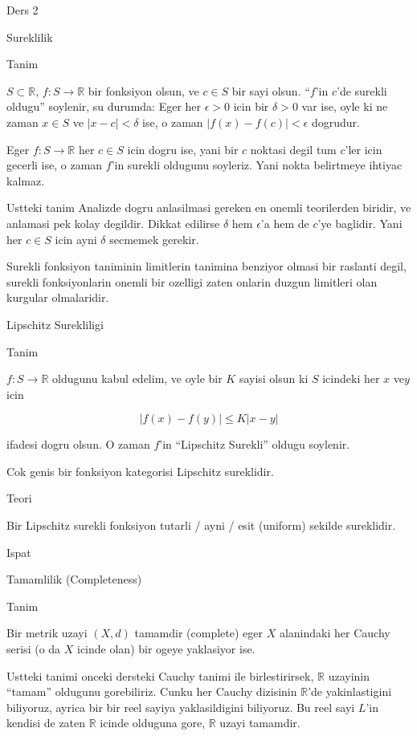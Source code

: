 \documentclass[12pt,fleqn]{article}
\begin{document}
Ders 2

Sureklilik

Tanim

$S \subset \mathbb{R}$, $f: S \to \mathbb{R}$ bir fonksiyon olsun, ve $c
\in S$ bir sayi olsun. 
``$f$'in $c$'de surekli oldugu'' soylenir, su durumda: Eger her
$\epsilon>0$ icin bir $\delta > 0$ var ise, oyle ki ne zaman $x \in S$ ve $|x-c| < \delta$
ise, o zaman $|f(x) - f(c)| < \epsilon$ dogrudur. 

Eger  $f: S \to \mathbb{R}$ her $c \in S$ icin dogru ise, yani bir $c$
noktasi degil tum $c$'ler icin gecerli ise, o zaman $f$'in surekli oldugunu
soyleriz. Yani nokta belirtmeye ihtiyac kalmaz. 

Ustteki tanim Analizde dogru anlasilmasi gereken en onemli teorilerden
biridir, ve anlamasi pek kolay degildir. Dikkat edilirse $\delta$ hem
$\epsilon$'a hem de $c$'ye baglidir. Yani her $c \in S$ icin ayni $\delta$
secmemek gerekir. 

Surekli fonksiyon taniminin limitlerin tanimina benziyor olmasi bir
raslanti degil, surekli fonksiyonlarin onemli bir ozelligi zaten onlarin
duzgun limitleri olan kurgular olmalaridir. 

Lipschitz Surekliligi 

Tanim 

$f: S \to \mathbb{R}$ oldugunu kabul edelim, ve oyle bir $K$ sayisi olsun ki $S$
icindeki her $x$ ve$y$ icin 

\[ |f(x) - f(y)| \le K|x-y| \]

ifadesi dogru olsun. O zaman $f$'in ``Lipschitz Surekli'' oldugu soylenir. 

Cok genis bir fonksiyon kategorisi Lipschitz sureklidir. 

Teori 

Bir Lipschitz surekli fonksiyon tutarli / ayni / esit (uniform) sekilde
sureklidir.

Ispat







Tamamlilik (Completeness) 

Tanim

Bir metrik uzayi $(X,d)$ tamamdir (complete) eger $X$ alanindaki her Cauchy
serisi (o da $X$ icinde olan) bir ogeye yaklasiyor ise. 

Ustteki tanimi onceki dersteki Cauchy tanimi ile birlestirirsek,
$\mathbb{R}$ uzayinin ``tamam'' oldugunu gorebiliriz. Cunku her Cauchy
dizisinin $\mathbb{R}$'de yakinlastigini biliyoruz, ayrica bir bir reel sayiya
yaklasildigini biliyoruz. Bu reel sayi $L$'in kendisi de zaten $\mathbb{R}$ icinde
olduguna gore, $\mathbb{R}$ uzayi tamamdir. 
\end{document}
